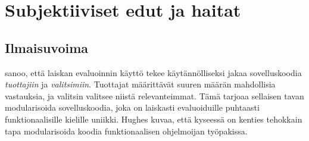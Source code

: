 

\section{Subjektiiviset edut ja haitat} \label{subjektiiviset-edut}

\subsection{Ilmaisuvoima}
\citet{hughes1989functional} sanoo, että laiskan evaluoinnin käyttö tekee käytännölliseksi jakaa sovelluskoodia \textit{tuottajiin} ja \textit{valitsimiin}. Tuottajat määrittävät suuren määrän mahdollisia vastauksia, ja valitsin valitsee niistä relevanteimmat. Tämä tarjoaa sellaisen tavan modularisoida sovelluskoodia, joka on laiskasti evaluoiduille puhtaasti funktionaalisille kielille uniikki. Hughes kuvaa, että kyseessä on kenties tehokkain tapa modularisoida koodia funktionaalisen ohjelmoijan työpakissa.

